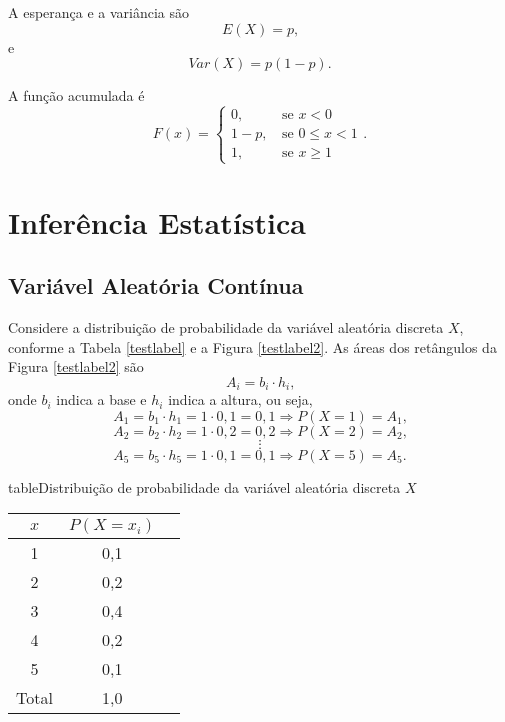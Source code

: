\documentclass[11pt,fleqn]{book}
\numberwithin{mpicture}{chapter}
\numberwithin{mtable}{chapter}
\numberwithin{mframe}{chapter}
\begin{document}
A esperança e a variância são
\begin{equation}
	E(X)=p\text{,}
\end{equation}
e
\begin{equation}
	Var(X)=p(1-p)\text{.}
\end{equation}


A função acumulada é
\begin{equation}
	F(x)=\begin{cases}
		0\text{,}&\text{ se }x < 0\\
		1-p\text{,}&\text{ se }0\leqslant x < 1\\
		1\text{,}&\text{ se } x\geqslant 1
	\end{cases}
	\text{.}
\end{equation}




\nosidepicturearea
\part{Inferência Estatística}


\opensidepicturearea

\chapter{Variável Aleatória Contínua}

\nocite{livro_bussab_morettin}
Considere a distribuição de probabilidade da variável aleatória discreta $X$, conforme a Tabela \ref{testlabel} e a Figura \ref{testlabel2}. As áreas dos retângulos da Figura \ref{testlabel2} são 
\[
	A_i = b_i\cdot h_i
	\text{,}
\]
onde $b_i$ indica a base e $h_i$ indica a altura, ou seja,
\[
	A_1 = b_1 \cdot h_1 = 1 \cdot 0,1 = 0,1 \Longrightarrow P(X=1)=A_1
	\text{,}
\]
\[
	A_2 = b_2 \cdot h_2 = 1 \cdot 0,2 = 0,2 \Longrightarrow P(X=2)=A_2
	\text{,}
\]
\[
	\vdots
\]
\[
	A_5 = b_5 \cdot h_5 = 1 \cdot 0,1 = 0,1 \Longrightarrow P(X=5)=A_5
	\text{.}
\]

\begin{sidepicture}{7cm}{table}{Distribuição de probabilidade da variável aleatória discreta $X$}
	\label{testlabel}
	\begin{tabular}{ccc}\\\toprule  
		$x$ & $P(X=x_i)$ \\ \midrule
		1 & 0,1 \\
		2 & 0,2 \\ 
		3 & 0,4 \\
		4 & 0,2 \\
		5 & 0,1 \\ \midrule
		Total & 1,0\\  \bottomrule
	\end{tabular}
\end{sidepicture}
\end{document}
